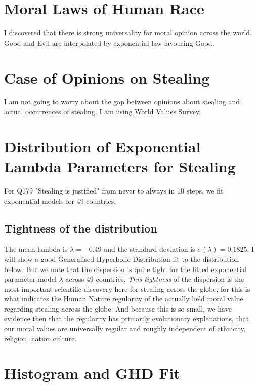 \documentclass{amsart}
\begin{document}
\section{Moral Laws of Human Race}

I discovered that there is strong universality for moral opinion across the world.  Good and Evil are interpolated by exponential law favouring Good.

\section{Case of Opinions on Stealing}

I am not going to worry about the gap between opinions about stealing and actual occurrences of stealing.  I am using World Values Survey.  

\section{Distribution of Exponential Lambda Parameters for Stealing}

For Q179 "Stealing is justified" from never to always in 10 steps, we fit exponential models for 49 countries.

\subsection{Tightness of the distribution}

The mean lambda is $\bar{\lambda} = -0.49$ and the standard deviation is $\sigma(\lambda) = 0.1825$.  I will show a good Generalised Hyperbolic Distribution fit to the distribution below.  But we note that the dispersion is quite tight for the fitted exponential parameter model $\lambda$ across 49 countries.  {\em This tightness} of the dispersion is the most important scientific discovery here for stealing across the globe, for this is what indicates the Human Nature regularity of the actually held moral value regarding stealing across the globe.  And because this is so small, we have evidence then that the regularity has primarily evolutionary explanations, that our moral values are universally regular and roughly independent of ethnicity, religion, nation,culture.

\section{Histogram and GHD Fit}
\end{document}
